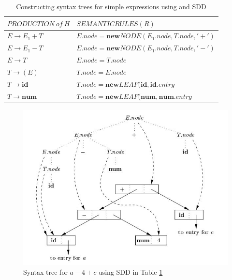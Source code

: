 \documentclass[12pt]{article}
\begin{document}
	\begin{table}[h!]
	  	\begin{tabular}{|l|l|}

	  		\hline
	  		$PRODUCTION\ of\ H$ & $SEMANTIC RULES (R)$\\

	  		\hline \hline

	    	$E \rightarrow E_{1} + T$ & $E.node = \mathbf{new} \mathit{NODE}(E_{1}.node, T.node, '+')$\\
	    	$E \rightarrow E_{1} - T$ & $E.node = \mathbf{new} \mathit{NODE}(E_{1}.node, T.node, '-')$\\
	    	$E \rightarrow T$ & $E.node = T.node$\\
			$T \rightarrow (E)$ & $T.node = E.node$\\
			$T \rightarrow \mathbf{id}$ & $T.node = \mathbf{new} \mathit{LEAF}(\mathbf{id}, \mathbf{id}.\mathit{entry}$\\
			$T \rightarrow \mathbf{num}$ & $T.node = \mathbf{new} \mathit{LEAF}(\mathbf{num}, \mathbf{num}.\mathit{entry}$\\
			\hline

	  	\end{tabular}
	  	\centering
	  	\caption{Constructing syntax trees for simple expressions using and SDD}
	  	\label{tab:table2}
	\end{table}


	\begin{figure}[h!]
		\begin{center}\includegraphics[scale=0.8]{stree.jpg}\end{center}
		\caption{Syntax tree for $a - 4 + c$ using SDD in Table \ref{tab:table2}}
  		\label{fig:stree5}
	\end{figure}
\end{document}
